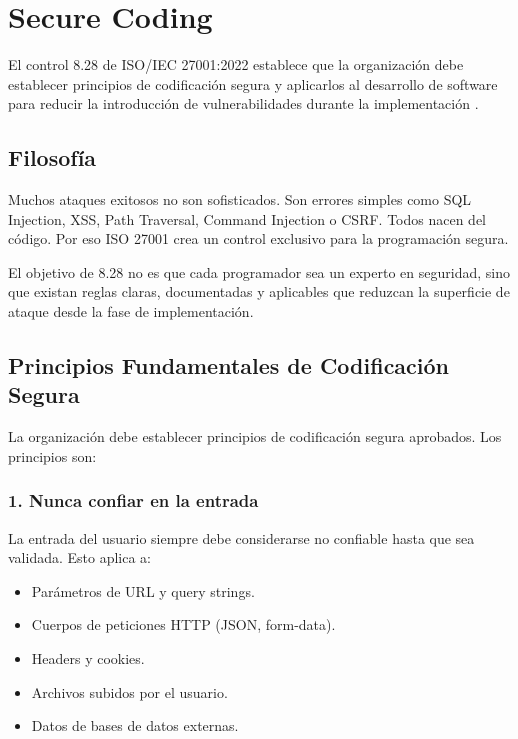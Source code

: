 \section{Secure Coding}
\label{sec:secure-coding}

El control 8.28 de ISO/IEC 27001:2022 establece que la organización debe establecer principios de codificación segura y aplicarlos al desarrollo de software para reducir la introducción de vulnerabilidades durante la implementación \cite{nist800218}.

\subsection{Filosofía}

Muchos ataques exitosos no son sofisticados. Son errores simples como SQL Injection, XSS, Path Traversal, Command Injection o CSRF. Todos nacen del código. Por eso ISO 27001 crea un control exclusivo para la programación segura.

El objetivo de 8.28 no es que cada programador sea un experto en seguridad, sino que existan reglas claras, documentadas y aplicables que reduzcan la superficie de ataque desde la fase de implementación.

\subsection{Principios Fundamentales de Codificación Segura}

La organización debe establecer principios de codificación segura aprobados. Los principios son:

\subsubsection{1. Nunca confiar en la entrada}

La entrada del usuario siempre debe considerarse no confiable hasta que sea validada. Esto aplica a:

\begin{itemize}
    \item Parámetros de URL y query strings.
    \item Cuerpos de peticiones HTTP (JSON, form-data).
    \item Headers y cookies.
    \item Archivos subidos por el usuario.
    \item Datos de bases de datos externas.
\end{itemize}

